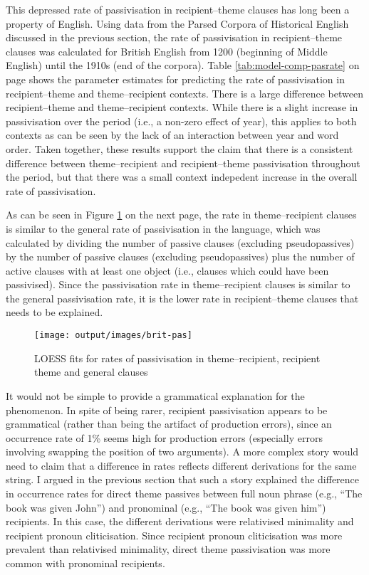 	This depressed rate of passivisation in recipient--theme clauses has long been a property of English. Using data from the Parsed Corpora of Historical English discussed in the previous section, the rate of passivisation in recipient--theme clauses was calculated for British English from 1200 (beginning of Middle English) until the 1910s (end of the corpora). Table \ref{tab:model-comp-pasrate} on page \pageref{tab:model-comp-pasrate} shows the parameter estimates for predicting the rate of passivisation in recipient--theme and theme--recipient contexts. There is a large difference between recipient--theme and theme--recipient contexts. While there is a slight increase in passivisation over the period (i.e., a non-zero effect of year), this applies to both contexts as can be seen by the lack of an interaction between year and word order. Taken together, these results support the claim that there is a consistent difference between theme--recipient and recipient--theme passivisation throughout the period, but that there was a small context indepedent  increase in the overall rate of passivisation.

	

	 As can be seen in Figure \ref{fig:brit-pas} on the next page, the rate in theme--recipient clauses is similar to the general rate of passivisation in the language, which was calculated by dividing the number of passive clauses (excluding pseudopassives) by the number of passive clauses (excluding pseudopassives) plus the number of active clauses with at least one object (i.e., clauses which could have been passivised). Since the passivisation rate in theme--recipient clauses is similar to the general passivisation rate, it is the lower rate in recipient--theme clauses that needs to be explained.

	\begin{figure}[ht!]
		\texttt{[image: output/images/brit-pas]}
		\caption{LOESS fits for rates of passivisation in theme--recipient, recipient theme and general clauses}
		\label{fig:brit-pas}
	\end{figure}

	It would not be simple to provide a grammatical explanation for the phenomenon. In spite of being rarer, recipient passivisation appears to be grammatical (rather than being the artifact of production errors), since an occurrence rate of 1\% seems high for production errors (especially errors involving swapping the position of two arguments). A more complex story would need to claim that a difference in rates reflects different derivations for the same string. I argued in the previous section that such a story explained the difference in occurrence rates for direct theme passives between full noun phrase (e.g., ``The book was given John'') and pronominal (e.g., ``The book was given him'') recipients. In this case, the different derivations were relativised minimality and recipient pronoun cliticisation. Since recipient pronoun cliticisation was more prevalent than relativised minimality, direct theme passivisation was more common with pronominal recipients.
	
